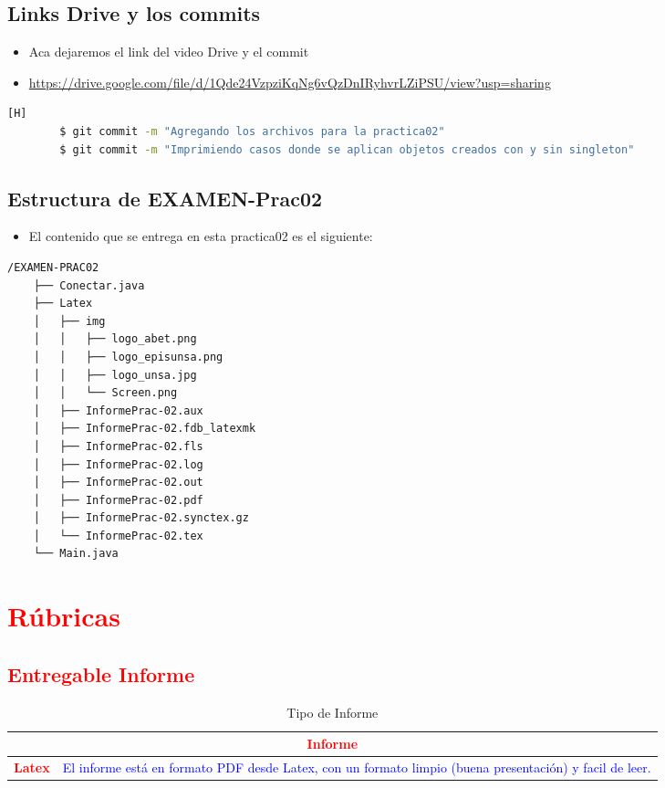 \documentclass{article}
\begin{document}
	\subsection{Links Drive y los commits}
	\begin{itemize}	
		\item Aca dejaremos el link del video Drive y el commit
		\item \url{https://drive.google.com/file/d/1Qde24VzpziKqNg6vQzDnIRyhvrLZiPSU/view?usp=sharing}
	\end{itemize}	
	\begin{lstlisting}[language=bash,caption={Commit}][H]
		$ git commit -m "Agregando los archivos para la practica02"
		$ git commit -m "Imprimiendo casos donde se aplican objetos creados con y sin singleton"
	\end{lstlisting}	
	\subsection{Estructura de EXAMEN-Prac02}
	\begin{itemize}	
		\item El contenido que se entrega en esta practica02 es el siguiente:
	\end{itemize}
	\begin{lstlisting}[style=ascii-tree]
	/EXAMEN-PRAC02	
	├── Conectar.java
	├── Latex
	│   ├── img
	│   │   ├── logo_abet.png
	│   │   ├── logo_episunsa.png
	│   │   ├── logo_unsa.jpg
	│   │   └── Screen.png
	│   ├── InformePrac-02.aux
	│   ├── InformePrac-02.fdb_latexmk
	│   ├── InformePrac-02.fls
	│   ├── InformePrac-02.log
	│   ├── InformePrac-02.out
	│   ├── InformePrac-02.pdf
	│   ├── InformePrac-02.synctex.gz
	│   └── InformePrac-02.tex
	└── Main.java

	\end{lstlisting}    
	\section{\textcolor{red}{Rúbricas}}
	
	\subsection{\textcolor{red}{Entregable Informe}}
	\begin{table}[H]
		\caption{Tipo de Informe}
		\setlength{\tabcolsep}{0.5em} %
		{\renewcommand{\arraystretch}{1.5}%
		\begin{tabular}{|p{3cm}|p{12cm}|}
			\hline
			\multicolumn{2}{|c|}{\textbf{\textcolor{red}{Informe}}}  \\
			\hline 
			\textbf{\textcolor{red}{Latex}} & \textcolor{blue}{El informe está en formato PDF desde Latex,  con un formato limpio (buena presentación) y facil de leer.}   \\ 
			\hline 
			
			
		\end{tabular}
	}
	\end{table}
	
\end{document}

